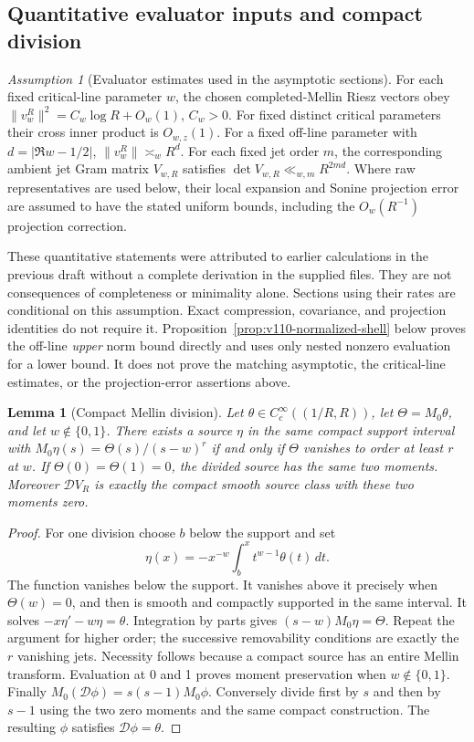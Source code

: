 \documentclass[11pt]{article}
\newtheorem{lemma}[theorem]{Lemma}
\theoremstyle{remark}
\newtheorem{assumption}[theorem]{Assumption}
\begin{document}
\subsection*{Quantitative evaluator inputs and compact division}
\begin{assumption}[Evaluator estimates used in the asymptotic sections]\label{ass:evaluators}
For each fixed critical-line parameter $w$, the chosen completed-Mellin
Riesz vectors obey $\|v_w^R\|^2=C_w\log R+O_w(1)$, $C_w>0$.
For fixed distinct critical parameters their cross inner product is
$O_{w,z}(1)$. For a fixed off-line parameter with
$d=|\Re w-1/2|$, $\|v_w^R\|\asymp_w R^d$.
For each fixed jet order $m$, the corresponding ambient jet Gram matrix
$V_{w,R}$ satisfies $\det V_{w,R}\ll_{w,m}R^{2md}$.
Where raw representatives are used below, their local expansion and
Sonine projection error are assumed to have the stated uniform bounds,
including the $O_w(R^{-1})$ projection correction.
\end{assumption}
These quantitative statements were attributed to earlier calculations in
the previous draft without a complete derivation in the supplied files.
They are not consequences of completeness or minimality alone. Sections
using their rates are conditional on this assumption. Exact compression,
covariance, and projection identities do not require it.
Proposition~\ref{prop:v110-normalized-shell} below proves the off-line
\emph{upper} norm bound directly and uses only nested nonzero evaluation
for a lower bound. It does not prove the matching asymptotic, the
critical-line estimates, or the projection-error assertions above.

\begin{lemma}[Compact Mellin division]\label{lem:compact-division}
Let $\theta\in C_c^\infty((1/R,R))$, let $\Theta=M_0\theta$, and let
$w\notin\{0,1\}$. There exists a source $\eta$ in the same compact
support interval with $M_0\eta(s)=\Theta(s)/(s-w)^r$ if and only if
$\Theta$ vanishes to order at least $r$ at $w$. If
$\Theta(0)=\Theta(1)=0$, the divided source has the same two moments.
Moreover $\mathcal D V_R$ is exactly the compact smooth source class with
these two moments zero.
\end{lemma}
\begin{proof}
For one division choose $b$ below the support and set
\[
 \eta(x)=-x^{-w}\int_b^x t^{w-1}\theta(t)\,dt.
\]
The function vanishes below the support. It vanishes above it precisely
when $\Theta(w)=0$, and then is smooth and compactly supported in the
same interval. It solves $-x\eta'-w\eta=\theta$. Integration by parts
gives $(s-w)M_0\eta=\Theta$. Repeat the argument for higher order; the
successive removability conditions are exactly the $r$ vanishing jets.
Necessity follows because a compact source has an entire Mellin transform.
Evaluation at 0 and 1 proves moment preservation when $w\notin\{0,1\}$.
Finally $M_0(\mathcal D\phi)=s(s-1)M_0\phi$. Conversely divide first by
$s$ and then by $s-1$ using the two zero moments and the same compact
construction. The resulting $\phi$ satisfies $\mathcal D\phi=\theta$.
\end{proof}
\end{document}
